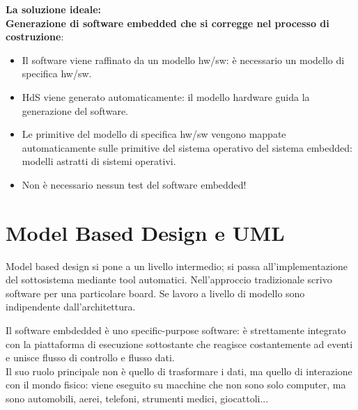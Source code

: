 \documentclass[a4paper]{article}
\theoremstyle{definition}
\begin{document}
			\noindent
			\textbf{La soluzione ideale:}\\
			\textbf{Generazione di software embedded che si corregge nel processo di costruzione}:
			\begin{itemize}
				\item Il software viene raffinato da un modello hw/sw: è necessario un modello di specifica hw/sw.
				\item HdS viene generato automaticamente: il modello hardware guida la generazione del software.
				\item Le primitive del modello di specifica hw/sw vengono mappate automaticamente sulle primitive del sistema operativo del sistema embedded: modelli astratti di sistemi operativi.
				\item Non è necessario nessun test del software embedded!
			\end{itemize}
			
			
	\section{Model Based Design e UML}
		Model based design si pone a un livello intermedio; si passa all'implementazione del sottosistema mediante tool automatici. Nell'approccio tradizionale scrivo software per una particolare board. Se lavoro a livello di modello sono indipendente dall'architettura.
		
		Il software embdedded è uno specific-purpose software: è strettamente integrato con la piattaforma di esecuzione sottostante che reagisce costantemente ad eventi e unisce flusso di controllo e flusso dati.\\
		Il suo ruolo principale non è quello di trasformare i dati, ma quello di interazione con il mondo fisico: viene eseguito su macchine che non sono solo computer, ma sono automobili, aerei, telefoni, strumenti medici, giocattoli...
		
\end{document}
